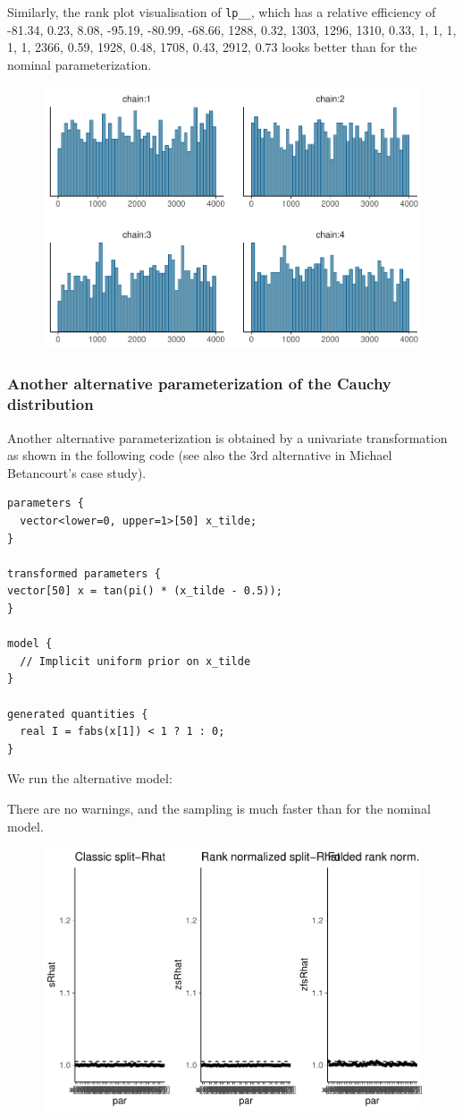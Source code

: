 \documentclass[american,]{article}
\begin{document}
Similarly, the rank plot visualisation of \texttt{lp\_\_}, which has a
relative efficiency of -81.34, 0.23, 8.08, -95.19, -80.99, -68.66, 1288,
0.32, 1303, 1296, 1310, 0.33, 1, 1, 1, 1, 1, 2366, 0.59, 1928, 0.48,
1708, 0.43, 2912, 0.73 looks better than for the nominal
parameterization.

\begin{figure}[tp]
  \centering
  \includegraphics[width=0.6\linewidth]{graphics/hist-fit-alt1-lp-1.pdf}
\end{figure}

\hypertarget{another-alternative-parameterization-of-the-cauchy-distribution}{%
\subsubsection*{Another alternative parameterization of the Cauchy
distribution}\label{another-alternative-parameterization-of-the-cauchy-distribution}}

Another alternative parameterization is obtained by a univariate
transformation as shown in the following code (see also the 3rd
alternative in Michael Betancourt's case study).

\begin{verbatim}
parameters {
  vector<lower=0, upper=1>[50] x_tilde;
}

transformed parameters {
vector[50] x = tan(pi() * (x_tilde - 0.5));
}

model {
  // Implicit uniform prior on x_tilde
}

generated quantities {
  real I = fabs(x[1]) < 1 ? 1 : 0;
}
\end{verbatim}

We run the alternative model:

There are no warnings, and the sampling is much faster than for the
nominal model.

\begin{figure}[tp]
  \centering
  \includegraphics[width=0.6\linewidth]{graphics/rhat-fit-alt3-1.pdf}
\end{figure}
\end{document}
